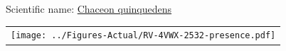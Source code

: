 \documentclass[12pt]{article}\usepackage[]{graphicx}\usepackage[]{color}
\begin{document}
  


Scientific name: \href{http://www.marinespecies.org/aphia.php?p=taxdetails\&id=158407}{Chaceon quinquedens} \newline
\begin{minipage}{1.0\textwidth}
 \begin{tabular}{c}
\texttt{[image: ../Figures-Actual/RV-4VWX-2532-presence.pdf]} \\ 
\end{tabular} 
\end{minipage}
\clearpage

\printindex
\end{document}
